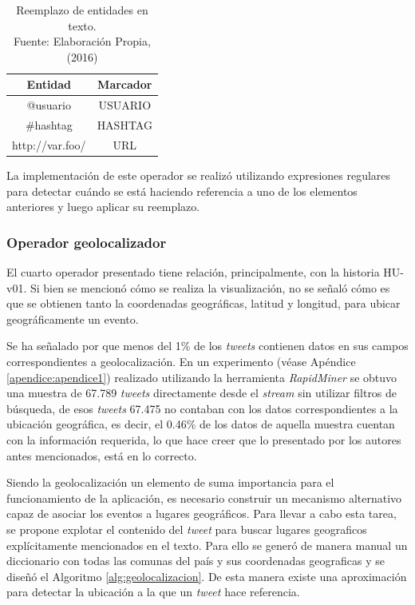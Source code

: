 \begin{table}[H]
\centering
\caption[Reemplazo de entidades en texto.]{Reemplazo de entidades en texto.\\Fuente: Elaboración Propia, (2016)}
\label{tab:reemplazosDeEntidades}
\begin{tabular}{|c|c|}
\hline
\textbf{Entidad} & \textbf{Marcador} \\ \hline
@usuario         & USUARIO            \\ \hline
\#hashtag        & HASHTAG            \\ \hline
http://var.foo/  & URL                \\ \hline
\end{tabular}
\end{table}

La implementación de este operador se realizó utilizando expresiones regulares para detectar cuándo se está haciendo referencia a uno de los elementos anteriores y luego aplicar su reemplazo.

\subsubsection*{Operador geolocalizador}
\label{subsubsec:4op}

El cuarto operador presentado tiene relación, principalmente, con la historia HU-v01. Si bien se mencionó cómo se realiza la visualización, no se señaló cómo es que se obtienen tanto la coordenadas geográficas, latitud y longitud, para ubicar geográficamente un evento.

Se ha señalado por \citep{ChatoSurvey} que menos del 1\% de los \textit{tweets} contienen datos en sus campos correspondientes a geolocalización. En un experimento (véase Apéndice \ref{apendice:apendice1}) realizado utilizando la herramienta \textit{RapidMiner} se obtuvo una muestra de 67.789 \textit{tweets} directamente desde el \textit{stream} sin utilizar filtros de búsqueda, de esos \textit{tweets} 67.475 no contaban con los datos correspondientes a la ubicación geográfica, es decir, el 0.46\% de los datos de aquella muestra cuentan con la información requerida, lo que hace creer que lo presentado por los autores antes mencionados, está en lo correcto.

Siendo la geolocalización un elemento de suma importancia para el funcionamiento de la aplicación, es necesario construir un mecanismo alternativo capaz de asociar los eventos a lugares geográficos. Para llevar a cabo esta tarea, se propone explotar el contenido del \textit{tweet} para buscar lugares geograficos explícitamente mencionados en el texto. Para ello se generó de manera manual un diccionario con todas las comunas del país y sus coordenadas geograficas y se diseñó el Algoritmo \ref{alg:geolocalizacion}. De esta manera existe una aproximación para detectar la ubicación a la que un \textit{tweet} hace referencia.\\

